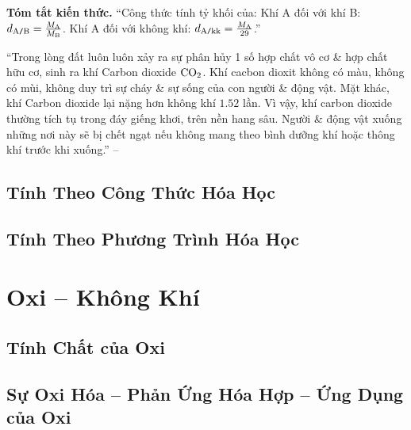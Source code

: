 \documentclass{article}
\numberwithin{equation}{section}
\begin{document}
\noindent\textbf{Tóm tắt kiến thức.} ``Công thức tính tỷ khối của: Khí A đối với khí B: $d_{\rm A\texttt{/}B} = \frac{M_{\rm A}}{M_{\rm B}}$. Khí A đối với không khí: $d_{\rm A\texttt{/}kk} = \frac{M_{\rm A}}{29}$.''

``Trong lòng đất luôn luôn xảy ra sự phân hủy 1 số hợp chất vô cơ \& hợp chất hữu cơ, sinh ra khí Carbon dioxide $\rm CO_2$. Khí cacbon dioxit không có màu, không có mùi, không duy trì sự cháy \& sự sống của con người \& động vật. Mặt khác, khí Carbon dioxide lại nặng hơn không khí $1.52$ lần. Vì vậy, khí carbon dioxide thường tích tụ trong đáy giếng khơi, trên nền hang sâu. Người \& động vật xuống những nơi này sẽ bị chết ngạt nếu không mang theo bình dưỡng khí hoặc thông khí trước khi xuống.'' -- \cite[p. 69]{SGK_Hoa_Hoc_8}


\subsection{Tính Theo Công Thức Hóa Học}


\subsection{Tính Theo Phương Trình Hóa Học}


\section{Oxi -- Không Khí}

\subsection{Tính Chất của Oxi}


\subsection{Sự Oxi Hóa -- Phản Ứng Hóa Hợp -- Ứng Dụng của Oxi}

\end{document}
